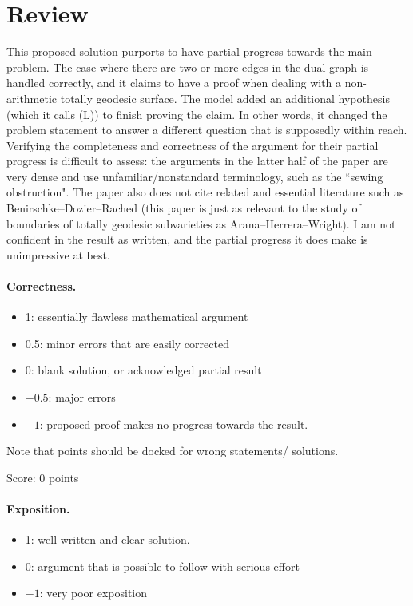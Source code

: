 \documentclass[11pt]{article}
\theoremstyle{remark}
\begin{document}
\maketitle

\section{Review}

This proposed solution purports to have partial progress towards the main problem. The case where there are two or more edges in the dual graph is handled correctly, and it claims to have a proof when dealing with a non-arithmetic totally geodesic surface. The model added an additional hypothesis (which it calls (L)) to finish proving the claim. In other words, it changed the problem statement to answer a different question that is supposedly within reach. Verifying the completeness and correctness of the argument for their partial progress is difficult to assess: the arguments in the latter half of the paper are very dense and use unfamiliar/nonstandard terminology, such as the ``sewing obstruction". The paper also does not cite related and essential literature such as Benirschke--Dozier--Rached (this paper is just as relevant to the study of boundaries of totally geodesic subvarieties as Arana--Herrera--Wright). I am not confident in the result as written, and the partial progress it does make is unimpressive at best.

\paragraph{Correctness.}
\begin{itemize}
	\item  1: essentially flawless mathematical argument
	\item  0.5: minor errors that are easily corrected
	\item  0: blank solution, or acknowledged partial result
	\item  $-0.5$: major errors
	\item  $-1$: proposed proof makes no progress towards the result.
\end{itemize}
Note that points should be docked for wrong statements/ solutions.

\noindent Score: 0 points

\paragraph{Exposition.}
\begin{itemize}
	\item  1: well-written and clear solution.
	\item  0: argument that is possible to follow with serious effort
	\item  $-1$: very poor exposition
\end{itemize}
\end{document}
